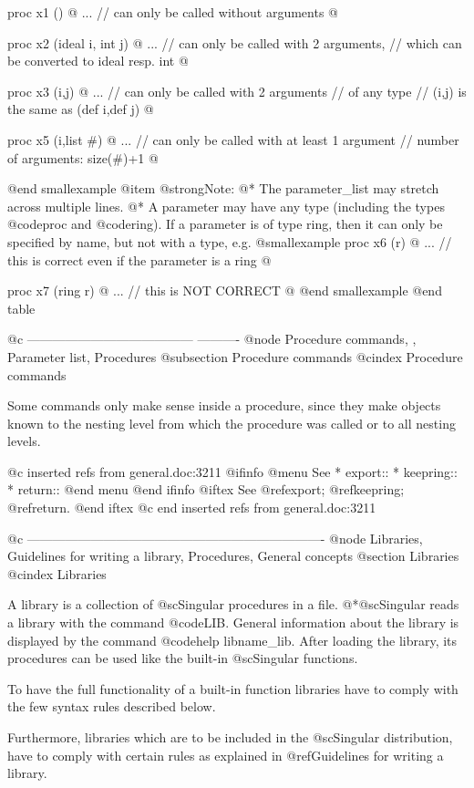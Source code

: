 {{{proc x1 ()
@{
... // can only be called without arguments
@}

proc x2 (ideal i, int j)
@{
... // can only be called with 2 arguments,
    // which can be converted to ideal resp. int
@}

proc x3 (i,j)
@{
... // can only be called with 2 arguments
    // of any type
    // (i,j) is the same as (def i,def j)
@}

proc x5 (i,list #)
@{
... // can only be called with at least 1 argument
    // number of arguments: size(#)+1
@}

@end smallexample
@item @strong{Note:}
@* The parameter_list may stretch across multiple lines.
@* A parameter may have any type (including the types @code{proc}
   and @code{ring}). If a parameter is of type ring, then it
   can only be specified by name, but not with a type, e.g.
@smallexample
proc x6 (r)
@{
... // this is correct even if the parameter is a ring
@}

proc x7 (ring r)
@{
... // this is NOT CORRECT
@}
@end smallexample
@end table

@c --------------------------------------- ----------
@node Procedure commands, , Parameter list, Procedures
@subsection Procedure commands
@cindex Procedure commands

Some commands only make sense inside a procedure, since they make
objects known to the nesting level from which the procedure was called
or to all nesting levels.

@c inserted refs from general.doc:3211
@ifinfo
@menu
See
* export::
* keepring::
* return::
@end menu
@end ifinfo
@iftex
See
@ref{export};
@ref{keepring};
@ref{return}.
@end iftex
@c end inserted refs from general.doc:3211

@c ----------------------------------------------------------------------
@node Libraries, Guidelines for writing a library, Procedures, General concepts
@section Libraries
@cindex Libraries

A library is a collection of @sc{Singular}
procedures in a file.
@*@sc{Singular} reads a library with the command
@code{LIB}. General information about the library is displayed by the command
@code{help libname_lib}. After loading the library, its procedures can be used
like the built-in @sc{Singular} functions.

To have the full functionality of a built-in function libraries have to
comply with the few syntax rules described below.

Furthermore, libraries which are to be included in the @sc{Singular}
distribution, have to comply with certain rules as explained in
@ref{Guidelines for writing a library}.

}}}

